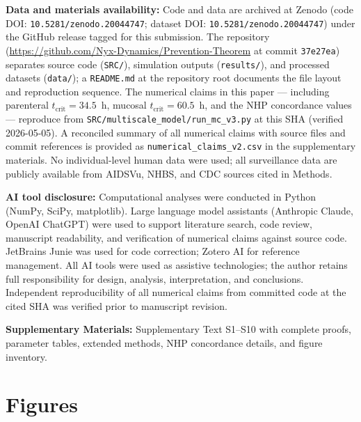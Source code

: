 \documentclass[11pt]{article}
\theoremstyle{definition}
\theoremstyle{remark}
\newcommand{\tcrit}{t_{\text{crit}}}
\begin{document}
\textbf{Data and materials availability:} Code and data are archived at Zenodo (code DOI: \texttt{10.5281/zenodo.20044747}; dataset DOI: \texttt{10.5281/zenodo.20044747}) under the GitHub release tagged for this submission. The repository (\url{https://github.com/Nyx-Dynamics/Prevention-Theorem} at commit \texttt{37e27ea}) separates source code (\texttt{SRC/}), simulation outputs (\texttt{results/}), and processed datasets (\texttt{data/}); a \texttt{README.md} at the repository root documents the file layout and reproduction sequence. The numerical claims in this paper --- including parenteral $\tcrit = 34.5$~h, mucosal $\tcrit = 60.5$~h, and the NHP concordance values --- reproduce from \texttt{SRC/multiscale\_model/run\_mc\_v3.py} at this SHA (verified 2026-05-05). A reconciled summary of all numerical claims with source files and commit references is provided as \texttt{numerical\_claims\_v2.csv} in the supplementary materials. No individual-level human data were used; all surveillance data are publicly available from AIDSVu, NHBS, and CDC sources cited in Methods.

\textbf{AI tool disclosure:} Computational analyses were conducted in Python (NumPy, SciPy, matplotlib). Large language model assistants (Anthropic Claude, OpenAI ChatGPT) were used to support literature search, code review, manuscript readability, and verification of numerical claims against source code. JetBrains Junie was used for code correction; Zotero AI for reference management. All AI tools were used as assistive technologies; the author retains full responsibility for design, analysis, interpretation, and conclusions. Independent reproducibility of all numerical claims from committed code at the cited SHA was verified prior to manuscript revision.

\textbf{Supplementary Materials:} Supplementary Text S1--S10 with complete proofs, parameter tables, extended methods, NHP concordance details, and figure inventory.

\newpage
\section*{Figures}
\end{document}
